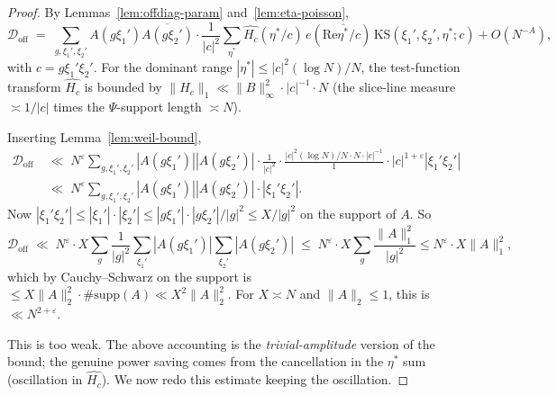 \documentclass[11pt]{article}
\theoremstyle{definition}
\renewcommand{\Re}{\mathrm{Re}}
\newcommand{\KS}{\mathrm{KS}}
\begin{document}
\begin{proof}
By Lemmas~\ref{lem:offdiag-param} and~\ref{lem:eta-poisson},
\[
\mathcal{D}_{\mathrm{off}}\;=\;\sum_{g,\xi_1',\xi_2'}A(g\xi_1')\overline{A(g\xi_2')}\cdot\frac{1}{|c|^2}\sum_{\eta^*}\widehat{H_c}(\eta^*/c)\,e(\Re\overline{\eta^*}/c)\,\KS(\xi_1',\xi_2',\eta^*;c)+O(N^{-A}),
\]
with $c=g\xi_1'\xi_2'$. For the dominant range $|\eta^*|\le|c|^2(\log N)/N$, the test-function transform $\widehat{H_c}$ is bounded by $\|H_c\|_1\ll\|B\|_\infty^2\cdot|c|^{-1}\cdot N$ (the slice-line measure $\asymp 1/|c|$ times the $\Psi$-support length $\asymp N$).

Inserting Lemma~\ref{lem:weil-bound},
\begin{align*}
\mathcal{D}_{\mathrm{off}}&\;\ll\;N^\varepsilon\sum_{g,\xi_1',\xi_2'}|A(g\xi_1')||A(g\xi_2')|\cdot\frac{1}{|c|^2}\cdot\frac{|c|^2(\log N)/N\cdot N\cdot|c|^{-1}}{1}\cdot|c|^{1+\varepsilon}|\xi_1'\xi_2'|\\
&\;\ll\;N^\varepsilon\sum_{g,\xi_1',\xi_2'}|A(g\xi_1')||A(g\xi_2')|\cdot|\xi_1'\xi_2'|.
\end{align*}
Now $|\xi_1'\xi_2'|\le|\xi_1'|\cdot|\xi_2'|\le|g\xi_1'|\cdot|g\xi_2'|/|g|^2\le X/|g|^2$ on the support of $A$. So
\[
\mathcal{D}_{\mathrm{off}}\;\ll\;N^\varepsilon\cdot X\sum_g\frac{1}{|g|^2}\sum_{\xi_1'}|A(g\xi_1')|\sum_{\xi_2'}|A(g\xi_2')|\;\le\;N^\varepsilon\cdot X\sum_g\frac{\|A\|_1^2}{|g|^2}\le N^\varepsilon\cdot X\|A\|_1^2,
\]
which by Cauchy--Schwarz on the support is $\le X\|A\|_2^2\cdot\#\mathrm{supp}(A)\ll X^2\|A\|_2^2$. For $X\asymp N$ and $\|A\|_2\le 1$, this is $\ll N^{2+\varepsilon}$.

This is too weak. The above accounting is the \emph{trivial-amplitude} version of the bound; the genuine power saving comes from the cancellation in the $\eta^*$ sum (oscillation in $\widehat{H_c}$). We now redo this estimate keeping the oscillation.


\end{proof}
\end{document}
